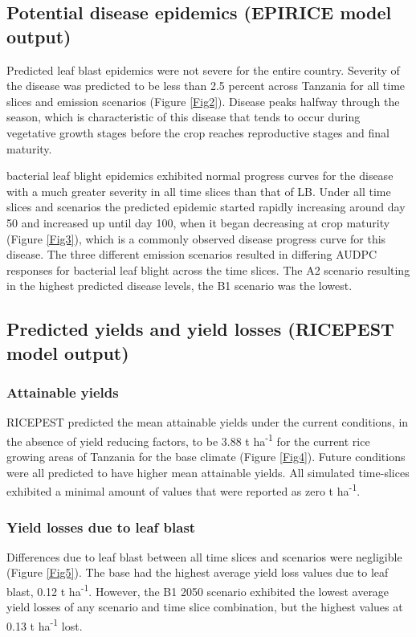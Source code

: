 \subsection{Potential disease epidemics (EPIRICE model output)}
\label{potential_epidemics}
    Predicted leaf blast epidemics were not severe for the entire country. Severity of the disease was predicted to be less than 2.5 percent across Tanzania for all time slices and emission scenarios (Figure \ref{Fig2}). Disease peaks halfway through the season, which is characteristic of this disease that tends to occur during vegetative growth stages before the crop reaches reproductive stages and final maturity.
    
    bacterial leaf blight epidemics exhibited normal progress curves for the disease with a much greater severity in all time slices than that of LB. Under all time slices and scenarios the predicted epidemic started rapidly increasing around day 50 and increased up until day 100, when it began decreasing at crop maturity (Figure \ref{Fig3}), which is a commonly observed disease progress curve for this disease. The three different emission scenarios resulted in differing AUDPC responses for bacterial leaf blight across the time slices. The A2 scenario resulting in the highest predicted disease levels, the B1 scenario was the lowest.
        
    \subsection{Predicted yields and yield losses (RICEPEST model output)}
    \label{predicted_yields}
    \subsubsection{Attainable yields}
    \label{attainable_yields}
    RICEPEST predicted the mean attainable yields under the current conditions, in the absence of yield reducing factors, to be 3.88 t ha\textsuperscript{-1} for the current rice growing areas of Tanzania for the base climate (Figure \ref{Fig4}). Future conditions were all predicted to have higher mean attainable yields. All simulated time-slices exhibited a minimal amount of values that were reported as zero t ha\textsuperscript{-1}.
    
    \subsubsection{Yield losses due to leaf blast}
    \label{lb_yield_losses}
    Differences due to leaf blast between all time slices and scenarios were negligible (Figure \ref{Fig5}). The base had the highest average yield loss values due to leaf blast, 0.12 t ha\textsuperscript{-1}. However, the B1 2050 scenario exhibited the lowest average yield losses of any scenario and time slice combination, but the highest values at 0.13 t ha\textsuperscript{-1} lost.
       
